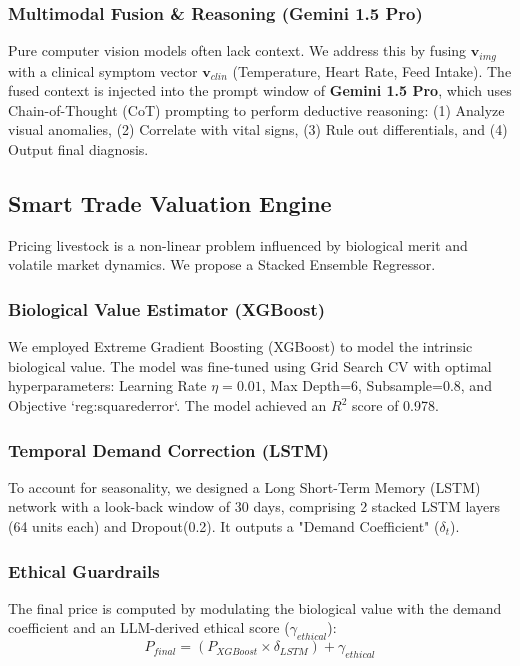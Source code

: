 \documentclass[conference]{IEEEtran}
\begin{document}
\subsubsection{Multimodal Fusion \& Reasoning (Gemini 1.5 Pro)}
Pure computer vision models often lack context. We address this by fusing $\mathbf{v}_{img}$ with a clinical symptom vector $\mathbf{v}_{clin}$ (Temperature, Heart Rate, Feed Intake). The fused context is injected into the prompt window of \textbf{Gemini 1.5 Pro}, which uses Chain-of-Thought (CoT) prompting to perform deductive reasoning: (1) Analyze visual anomalies, (2) Correlate with vital signs, (3) Rule out differentials, and (4) Output final diagnosis.

\subsection{Smart Trade Valuation Engine}
Pricing livestock is a non-linear problem influenced by biological merit and volatile market dynamics. We propose a Stacked Ensemble Regressor.

\subsubsection{Biological Value Estimator (XGBoost)}
We employed Extreme Gradient Boosting (XGBoost) to model the intrinsic biological value. The model was fine-tuned using Grid Search CV with optimal hyperparameters: Learning Rate $\eta=0.01$, Max Depth=6, Subsample=0.8, and Objective `reg:squarederror`. The model achieved an $R^2$ score of 0.978.

\subsubsection{Temporal Demand Correction (LSTM)}
To account for seasonality, we designed a Long Short-Term Memory (LSTM) network with a look-back window of 30 days, comprising 2 stacked LSTM layers (64 units each) and Dropout(0.2). It outputs a "Demand Coefficient" ($\delta_t$).

\subsubsection{Ethical Guardrails}
The final price is computed by modulating the biological value with the demand coefficient and an LLM-derived ethical score ($\gamma_{ethical}$):
\begin{equation}
P_{final} = (P_{XGBoost} \times \delta_{LSTM}) + \gamma_{ethical}
\end{equation}
\end{document}
